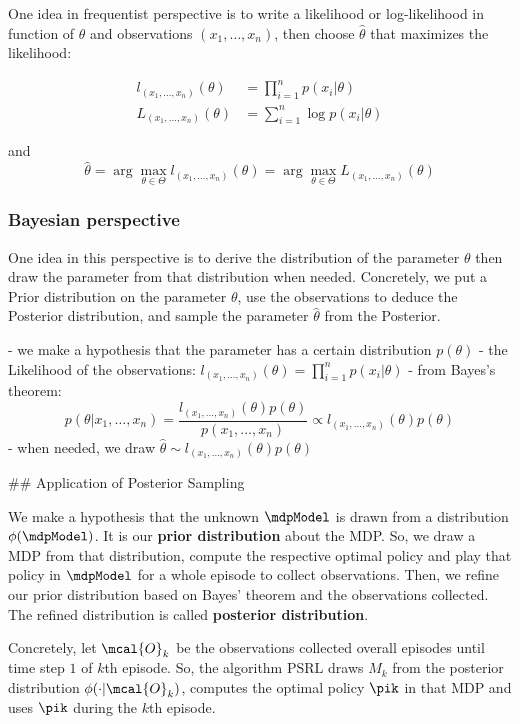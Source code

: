     One idea in frequentist perspective is to write a likelihood or log-likelihood in function of $\theta$ and observations $(x_1,\dots,x_n)$, then choose $\hat{\theta}$ that maximizes the likelihood:
    
    \begin{align*}
    l_{(x_1,\dots,x_n)}(\theta)&=\prod_{i=1}^{n}p(x_i|\theta) \\
    L_{(x_1,\dots,x_n)}(\theta)&=\sum_{i=1}^{n}\log p(x_i|\theta)
    \end{align*}
    
    and $$\hat{\theta}=\arg\max_{\theta\in\Theta}l_{(x_1,\dots,x_n)}(\theta)=\arg\max_{\theta\in\Theta}L_{(x_1,\dots,x_n)}(\theta)$$
    
    \subsubsection{Bayesian perspective}
    \label{subsubsec:bayes_perspective}
    
    One idea in this perspective is to derive the distribution of the parameter $\theta$ then draw the parameter from that distribution when needed. Concretely, we put a Prior distribution on the parameter $\theta$, use the observations to deduce the Posterior distribution, and sample the parameter $\hat{\theta}$ from the Posterior.
    
    - we make a hypothesis that the parameter has a certain distribution $p(\theta)$
    - the Likelihood of the observations: $l_{(x_1,\dots,x_n)}(\theta)=\prod_{i=1}^{n}p(x_i|\theta)$
    - from Bayes's theorem: $$p(\theta|x_1,\dots,x_n) =\frac{l_{(x_1,\dots,x_n)}(\theta)p(\theta)}{p(x_1,\dots,x_n)} \propto l_{(x_1,\dots,x_n)}(\theta)p(\theta)$$
    - when needed, we draw $\hat{\theta}\sim l_{(x_1,\dots,x_n)}(\theta)p(\theta)$
    
    ## Application of Posterior Sampling
    
    We make a hypothesis that the unknown $\mdpModel$ is drawn from a distribution $\phi(\mdpModel)$. It is our \textbf{prior distribution} about the MDP. So, we draw a MDP from that distribution, compute the respective optimal policy and play that policy in $\mdpModel$ for a whole episode to collect observations. Then, we refine our prior distribution based on Bayes' theorem and the observations collected. The refined distribution is called \textbf{posterior distribution}.
    
    Concretely, let $\mcal{O}_k$ be the observations collected overall episodes until time step $1$ of $k$th episode. So, the algorithm $\mathrm{PSRL}$ draws $M_k$ from the posterior distribution $\phi(\cdot|\mcal{O}_k)$, computes the optimal policy $\pik$ in that MDP and uses $\pik$ during the $k$th episode.
    
